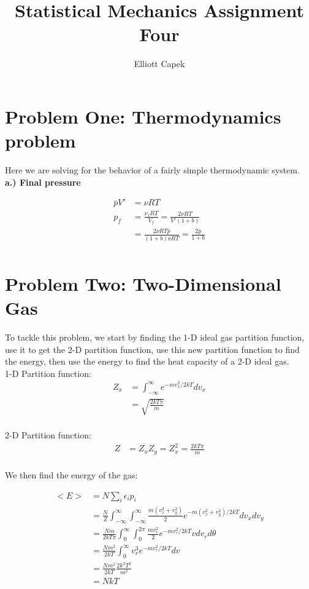 \documentclass[10pt]{article} %
\title{Statistical Mechanics Assignment Four}
\author{Elliott Capek}
\begin{document}
\maketitle{}

\section{Problem One: Thermodynamics problem}
Here we are solving for the behavior of a fairly simple thermodynamic system.\\

\textbf{a.) Final pressure}

\begin{align*}
  \bar{p}V' &= \nu RT\\
  p_f &= \frac{\nu_f RT}{V_f} = \frac{2\nu RT}{V'(1+b)}\\
  &= \frac{2\nu RT\bar{p}}{(1+b)\nu RT} = \frac{2\bar{p}}{1+b}\\
\end{align*}

\section{Problem Two: Two-Dimensional Gas}
To tackle this problem, we start by finding the 1-D ideal gas partition function, use it to get the
2-D partition function, use this new partition function to find the energy, then use the energy
to find the heat capacity of a 2-D ideal gas.\\

1-D Partition function:
\begin{align*}
  Z_x &= \int_{-\infty}^{\infty} e^{-mv_x^2/2kT} dv_x\\
  &= \sqrt{\frac{2kT\pi}{m}}\\
\end{align*}

2-D Partition function:
\begin{align*}
  Z &= Z_xZ_y = Z_x^2 = \frac{2kT\pi}{m}\\
\end{align*}

We then find the energy of the gas:

\begin{align*}
  <E> &= N\sum_{i} \epsilon_i p_i\\
  &= \frac{N}{Z}\int_{-\infty}^{\infty}\int_{-\infty}^{\infty}
  \frac{m(v_x^2+v_y^2)}{2}e^{-m(v_x^2+v_y^2)/2kT} dv_xdv_y\\
  &= \frac{Nm}{2kT\pi}
  \int_{0}^{\infty}\int_0^{2\pi}\frac{mv_r^2}{2}e^{-mv_r^2/2kT}vdv_rd\theta\\
  &= \frac{Nm^2}{2kT} \int_{0}^{\infty} v_r^3e^{-mv_r^2/2kT}dv\\
  &= \frac{Nm^2}{2kT}\frac{2k^2T^2}{m^2}\\
  &= NkT\\
\end{align*}
\end{document}
